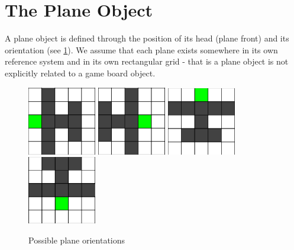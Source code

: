 \section{The Plane Object}
A plane object is defined through the position of its head  (plane front) and its orientation (see \ref{fig:plane_orientations}).  We assume that each plane exists somewhere in its own reference system and in its own rectangular grid - that is a plane object is not explicitly related to a game board object. 

\begin{figure}[h]
  \includegraphics[width = 3cm]{PlaneEastWest.png}
  \includegraphics[width = 3cm]{PlaneWestEast.png}
  \includegraphics[width = 3cm]{PlaneNorthSouth.png}
  \includegraphics[width = 3cm]{PlaneSouthNorth.png}
  \caption{Possible plane orientations}
  \label{fig:plane_orientations}
\end{figure}

